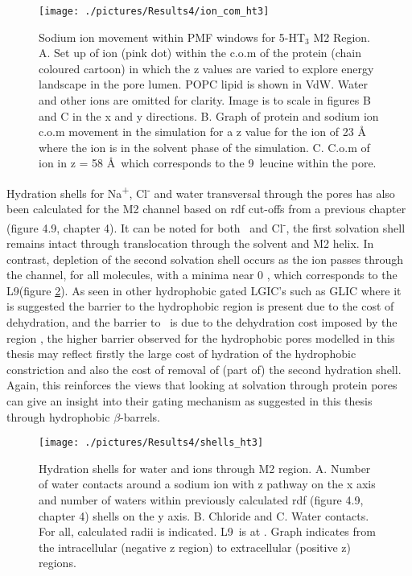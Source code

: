 \begin{figure}[H]
\begin{center}
\texttt{[image: ./pictures/Results4/ion\_com\_ht3]}
\caption[Sodium ion movement within PMF windows for 5-HT$_3$ M2 Region.] {Sodium ion movement within PMF windows for 5-HT$_3$ M2 Region. A. Set up of ion (pink dot) within the c.o.m of the protein (chain coloured cartoon) in which the z values are varied to explore energy landscape in the pore lumen. POPC lipid is shown in VdW. Water and other ions are omitted for clarity. Image is to scale in  figures B and C in the x and y directions. B. Graph of protein and sodium ion c.o.m movement in the simulation for a z value for the ion of 23 \AA\,  where the ion is in the solvent phase of the simulation. C. C.o.m of ion in z = 58 \AA\, which corresponds to the 9\textquotesingle\ leucine within the pore.} 
\label{fig:ion_com_ht3}
\end{center}
\end{figure}

Hydration shells for Na\textsuperscript{+}, Cl\textsuperscript{-} and water transversal through the pores has also been calculated for the M2 channel based on rdf cut-offs from a previous chapter (figure 4.9, chapter 4). It can be noted for both \Na\ and Cl\textsuperscript{-}, the first solvation shell remains intact through translocation through the solvent and M2 helix. In contrast, depletion of the second solvation shell occurs as the ion passes through the channel, for all molecules, with a minima near 0 \angstrom, which corresponds to the L9\textquotesingle  (figure \ref{fig:shells_ht3}). As seen in other hydrophobic gated LGIC's such as GLIC where it is suggested the barrier to the hydrophobic region is present due to the cost of dehydration, and the barrier to \Na\ is due to the dehydration cost imposed by the region \cite{Richards2012}, the higher barrier observed for the hydrophobic pores modelled in this thesis may reflect firstly the large cost of hydration of the hydrophobic constriction and also the cost of removal of (part of) the second hydration shell. Again, this reinforces the views that looking at  solvation through protein pores can give an insight into their gating mechanism as suggested in this thesis through hydrophobic $\beta$-barrels. 

\begin{figure}[H]
\begin{center}
\texttt{[image: ./pictures/Results4/shells\_ht3]}
\caption[Hydration shells for water and ions through M2 region.] {Hydration shells for water and ions through M2 region. A. Number of water contacts around a sodium ion with z pathway on the x axis and number of waters within previously calculated rdf (figure 4.9, chapter 4) shells on the y axis. B. Chloride and C. Water contacts. For all, calculated radii is indicated. L9\textquotesingle\ is at  \angstrom . Graph indicates from the intracellular (negative z region) to extracellular (positive z) regions.} %
\label{fig:shells_ht3}
\end{center}
\end{figure}


